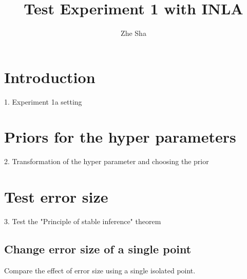 \documentclass[a4paper,12pt]{article}
\begin{document}
\title{Test Experiment 1 with INLA}
\author{Zhe Sha}
\maketitle

\onehalfspacing
{}

\section{Introduction}
1.  Experiment 1a setting

\section{Priors for the hyper parameters }
2. Transformation of the hyper parameter and choosing the prior

\newpage
\section{Test error size}
3. Test the "Principle of stable inference" theorem 
\subsection{Change error size of a single point}
 Compare the effect of error size using a single isolated point.
 
\end{document}

